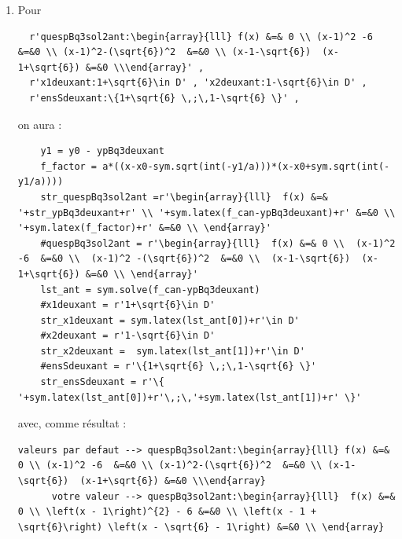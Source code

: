 {\begin{enumerate}
\item Pour
\begin{verbatim}
  r'quespBq3sol2ant:\begin{array}{lll} f(x) &=& 0 \\ (x-1)^2 -6  &=&0 \\ (x-1)^2-(\sqrt{6})^2  &=&0 \\ (x-1-\sqrt{6})  (x-1+\sqrt{6}) &=&0 \\\end{array}' , 
  r'x1deuxant:1+\sqrt{6}\in D' , 'x2deuxant:1-\sqrt{6}\in D' , 
  r'ensSdeuxant:\{1+\sqrt{6} \,;\,1-\sqrt{6} \}' , 
\end{verbatim}
on aura : 
\begin{verbatim}
    y1 = y0 - ypBq3deuxant
    f_factor = a*((x-x0-sym.sqrt(int(-y1/a)))*(x-x0+sym.sqrt(int(-y1/a))))
    str_quespBq3sol2ant =r'\begin{array}{lll}  f(x) &=& '+str_ypBq3deuxant+r' \\ '+sym.latex(f_can-ypBq3deuxant)+r' &=&0 \\ '+sym.latex(f_factor)+r' &=&0 \\ \end{array}' 
    #quespBq3sol2ant = r'\begin{array}{lll}  f(x) &=& 0 \\  (x-1)^2 -6  &=&0 \\  (x-1)^2 -(\sqrt{6})^2  &=&0 \\  (x-1-\sqrt{6})  (x-1+\sqrt{6}) &=&0 \\ \end{array}'
    lst_ant = sym.solve(f_can-ypBq3deuxant)
    #x1deuxant = r'1+\sqrt{6}\in D' 
    str_x1deuxant = sym.latex(lst_ant[0])+r'\in D'
    #x2deuxant = r'1-\sqrt{6}\in D' 
    str_x2deuxant =  sym.latex(lst_ant[1])+r'\in D'
    #ensSdeuxant = r'\{1+\sqrt{6} \,;\,1-\sqrt{6} \}' 
    str_ensSdeuxant = r'\{ '+sym.latex(lst_ant[0])+r'\,;\,'+sym.latex(lst_ant[1])+r' \}'
\end{verbatim}
avec, comme résultat :
\begin{verbatim}
valeurs par defaut --> quespBq3sol2ant:\begin{array}{lll} f(x) &=& 0 \\ (x-1)^2 -6  &=&0 \\ (x-1)^2-(\sqrt{6})^2  &=&0 \\ (x-1-\sqrt{6})  (x-1+\sqrt{6}) &=&0 \\\end{array}
      votre valeur --> quespBq3sol2ant:\begin{array}{lll}  f(x) &=& 0 \\ \left(x - 1\right)^{2} - 6 &=&0 \\ \left(x - 1 + \sqrt{6}\right) \left(x - \sqrt{6} - 1\right) &=&0 \\ \end{array}


\end{verbatim}
\end{enumerate}}
